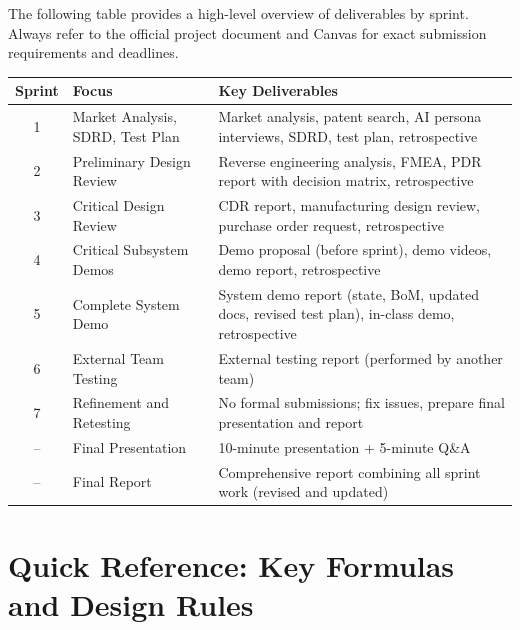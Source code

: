 \documentclass[11pt,letterpaper]{article}
\begin{document}
The following table provides a high-level overview of deliverables by sprint. Always refer to the official project document and Canvas for exact submission requirements and deadlines.

\begin{table}[htbp]
\centering
\small
\begin{tabularx}{\textwidth}{@{} c l X @{}}
\toprule
\textbf{Sprint} & \textbf{Focus} & \textbf{Key Deliverables} \\
\midrule
1 & Market Analysis, SDRD, Test Plan & Market analysis, patent search, AI persona interviews, SDRD, test plan, retrospective \\
2 & Preliminary Design Review & Reverse engineering analysis, FMEA, PDR report with decision matrix, retrospective \\
3 & Critical Design Review & CDR report, manufacturing design review, purchase order request, retrospective \\
4 & Critical Subsystem Demos & Demo proposal (before sprint), demo videos, demo report, retrospective \\
5 & Complete System Demo & System demo report (state, BoM, updated docs, revised test plan), in-class demo, retrospective \\
6 & External Team Testing & External testing report (performed by another team) \\
7 & Refinement and Retesting & No formal submissions; fix issues, prepare final presentation and report \\
-- & Final Presentation & 10-minute presentation + 5-minute Q\&A \\
-- & Final Report & Comprehensive report combining all sprint work (revised and updated) \\
\bottomrule
\end{tabularx}
\end{table}

\section{Quick Reference: Key Formulas and Design Rules}
\end{document}

